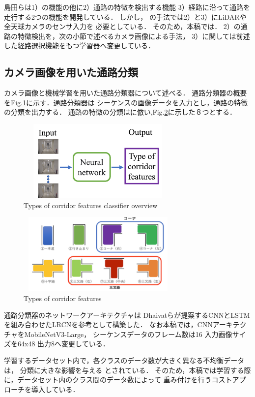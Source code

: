 \documentclass{sice-si}
\begin{document}
\par
島田らは1）の機能の他に2）通路の特徴を検出する機能
3）経路に沿って通路を走行する2つの機能を開発している．
しかし，\cite{shimada2020}\cite{hara2022}
の手法では2）と3）にLiDARや全天球カメラのセンサ入力を
必要としている．
そのため，本稿では．
2）の通路の特徴検出を，次の小節で述べるカメラ画像による手法，
3）に関しては前述した経路選択機能をもつ学習器へ変更している．

\subsection{カメラ画像を用いた通路分類}
カメラ画像と機械学習を用いた通路分類器について述べる．
通路分類器の概要をFig.\ref{fig:lrcn}に示す．通路分類器は
シーケンスの画像データを入力とし，通路の特徴の分類を出力する．
通路の特徴の分類は\cite{shimada2020}に倣い,Fig.\ref{fig:intersection}に示した８つとする．
\begin{figure}[h!]
    \centering
     \includegraphics[height=40mm,width=80mm]{./figs/LRCN_gai.png}
     \caption{Types of corridor features classifier overview}\label{fig:lrcn}
\end{figure}
\begin{figure}[h!]
    \centering
     \includegraphics[height=40mm,width=80mm]{./figs/intersection.png}
     \caption{Types of corridor features\cite{shimada2020}}\label{fig:intersection}
\end{figure}
\par
通路分類器のネットワークアーキテクチャは
Dhaivatらが提案するCNNとLSTMを組み合わせたLRCN\cite{lrcn}を参考として構築した．
なお本稿では，CNNアーキテクチャをMobileNetV3-Large\cite{v3}，
シーケンスデータのフレーム数は16 入力画像サイズを64x48 出力8へ変更している．
\par
学習するデータセット内で，各クラスのデータ数が大きく異なる不均衡データは，
分類に大きな影響を与える
\cite{hukin}
とされている．
そのため，本稿では学習する際に，データセット内のクラス間のデータ数によって
重み付けを行うコストアプローチ\cite{cost}を導入している．
\end{document}
